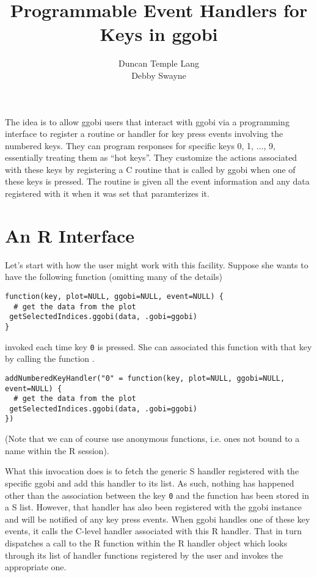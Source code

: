 \documentclass{article}
\title{Programmable Event Handlers for Keys in ggobi}
\author{Duncan Temple Lang \\
Debby Swayne}
\def\Key#1{\texttt{#1}}
\begin{document}
\maketitle

The idea is to allow ggobi users that interact with ggobi via a
programming interface to register a routine or handler for key press
events involving the numbered keys. They can program responses for
specific keys 0, 1, $\ldots$, 9, essentially treating them as ``hot
keys''.  They customize the actions associated with these keys by
registering a C routine that is called by ggobi when one of these keys
is pressed. The routine is given all the event information and any
data registered with it when it was set that paramterizes it.


\section{An R Interface}
Let's start with how the user might work with this facility.
Suppose she wants to have the following function (omitting many of the details)
\begin{verbatim}
function(key, plot=NULL, ggobi=NULL, event=NULL) {
  # get the data from the plot
 getSelectedIndices.ggobi(data, .gobi=ggobi)
}
\end{verbatim}
invoked each time key \Key{0} is pressed.
She can associated this function with that key
by calling the function
.
\begin{verbatim}
addNumberedKeyHandler("0" = function(key, plot=NULL, ggobi=NULL, event=NULL) {
  # get the data from the plot
 getSelectedIndices.ggobi(data, .gobi=ggobi)
})
\end{verbatim}
(Note that we can of course use anonymous functions, i.e. ones not
bound to a name within the R session).

What this invocation does is to fetch the generic S handler registered
with the specific ggobi and add this handler to its list.
As such, nothing has happened other than the association between the
key \Key{0} and the function has been stored in a S list.
However, that handler has also been registered with the ggobi instance
and will be notified of any key press events. When ggobi handles one
of these key events, it calls the C-level handler associated with this
R handler. That in turn dispatches a call to the R function within
the R handler object which looks through its list of handler functions
registered by the user and invokes the appropriate one.
\end{document}
